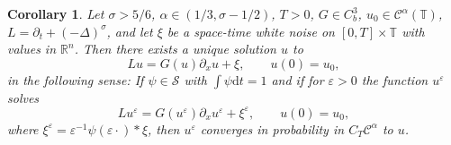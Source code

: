 \documentclass[11pt,a4paper]{article}
\newcommand{\mathd}{\mathrm{d}}
\newtheorem{corollary}[theorem]{Corollary}
\theoremstyle{remark}
\newcommand{\R}{\mathbb{R}}
\newcommand{\Lcal}{\mathcal{L}}
\newcommand{\CC}{\ensuremath{\mathscr{C}}}
\newcommand{\CS}{\ensuremath{\mathscr{S}}}
\begin{document}
\begin{corollary}
  Let $\sigma > 5/6$, $\alpha \in ( 1/3, \sigma -1/2 )$, $T>0$, $G \in C^3_b$, $u_0 \in \CC^\alpha(\mathbb{T})$, $L = \partial_t + (-\Delta)^\sigma$, and let $\xi$ be a space-time white noise on $[0,T] \times \mathbb{T}$ with values in $\R^n$. Then there exists a unique solution $u$ to
  \[
     L u = G(u) \partial_x u + \xi, \qquad u(0) = u_0,
  \]
  in the following sense: If $\psi \in \CS$ with $\int \psi \mathd t=1$ and if for $\varepsilon > 0$ the function $u^\varepsilon$ solves
  \[
     L u^\varepsilon = G(u^\varepsilon) \partial_x u^\varepsilon + \xi^\varepsilon, \qquad u(0) = u_0,
  \]
  where $\xi^\varepsilon = \varepsilon^{-1} \psi(\varepsilon \cdot) \ast \xi$, then $u^\varepsilon$ converges in probability in $C_T \CC^\alpha$ to $u$.
%  
%  
\end{corollary}
\end{document}
